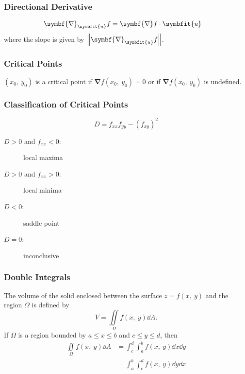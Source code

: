 \documentclass{article}
\begin{document}
\begin{multicols}{3}
    \subsubsection*{Directional Derivative}
    \begin{align*}
        \symbf{\nabla}_{\symbfit{u}}f
         & = \symbf{\nabla}f \cdot \symbfit{u}
    \end{align*}
    where the slope is given by $\norm{\symbf{\nabla}_{\symbfit{u}}f}$.
    \subsubsection*{Critical Points}
    $(x_0,\: y_0)$ is a critical point if $\symbf{\nabla}f(x_0,\: y_0) = 0$
    or if $\symbf{\nabla}f(x_0,\: y_0)$ is undefined.
    \subsubsection*{Classification of Critical Points}
    \begin{equation*}
        D = f_{xx}f_{yy} - \left( f_{xy} \right)^2
    \end{equation*}
    \begin{description}
        \item[$D > 0$ and $f_{xx} < 0$:] local maxima
        \item[$D > 0$ and $f_{xx} > 0$:] local minima
        \item[$D < 0$:] saddle point
        \item[$D = 0$:] inconclusive
    \end{description}
    \subsubsection*{Double Integrals}
    The volume of the solid
    enclosed between the surface $z=f(x,\: y)$ and the region $\Omega$ is
    defined by
    \begin{equation*}
        V = \iint\limits_{\Omega} f(x,\: y) \dd{A}.
    \end{equation*}
    If $\Omega$ is a region bounded by $a \leq x \leq b$ and $c \leq y \leq d$, then
    \begin{align*}
        \iint\limits_{\Omega} f(x,\: y) \dd{A} & = \int_c^d\int_a^b f(x,\: y) \dd{x} \dd{y} \\
                                               & = \int_a^b\int_c^d f(x,\: y) \dd{y} \dd{x}
    \end{align*}

\end{multicols}
\end{document}
